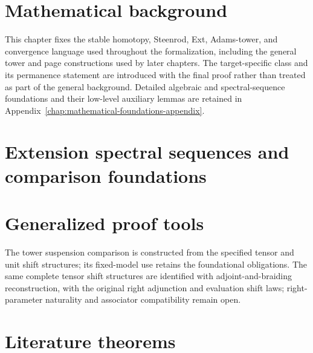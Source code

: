 \chapter{Mathematical background}
\label{chap:mathematical-setting}

This chapter fixes the stable homotopy, Steenrod, Ext, Adams-tower, and
convergence language used throughout the formalization, including the general
tower and page constructions used by later chapters. The target-specific
class and its permanence statement are introduced with the final proof rather
than treated as part of the general background. Detailed algebraic and
spectral-sequence foundations and their low-level auxiliary lemmas are retained
in Appendix~\ref{chap:mathematical-foundations-appendix}.





\chapter{Extension spectral sequences and comparison foundations}
\label{chap:extension-spectral-sequences-main}






\chapter{Generalized proof tools}
\label{chap:generalized-tools-main}
The tower suspension comparison is constructed from the specified tensor and
unit shift structures; its fixed-model use retains the foundational obligations.
The same complete tensor shift structures are identified with adjoint-and-braiding
reconstruction, with the original right adjunction and evaluation shift laws;
right-parameter naturality and associator compatibility remain open.


\chapter{Literature theorems}
\label{chap:literature-theorems-main}


